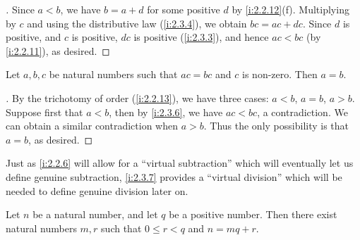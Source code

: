 \begin{proof}[]
  Since \(a < b\), we have \(b = a + d\) for some positive \(d\) by \cref{i:2.2.12}(f).
  Multiplying by \(c\) and using the distributive law (\cref{i:2.3.4}), we obtain \(bc = ac + dc\).
  Since \(d\) is positive, and \(c\) is positive, \(dc\) is positive (\cref{i:2.3.3}), and hence \(ac < bc\) (by \cref{i:2.2.11}), as desired.
\end{proof}

\begin{cor}\label{i:2.3.7}
  Let \(a, b, c\) be natural numbers such that \(ac = bc\) and \(c\) is non-zero.
  Then \(a = b\).
\end{cor}

\begin{proof}[]
  By the trichotomy of order (\cref{i:2.2.13}), we have three cases: \(a < b\), \(a = b\), \(a > b\).
  Suppose first that \(a < b\), then by \cref{i:2.3.6}, we have \(ac < bc\), a contradiction.
  We can obtain a similar contradiction when \(a > b\).
  Thus the only possibility is that \(a = b\), as desired.
\end{proof}

\begin{rmk}\label{i:2.3.8}
  Just as \cref{i:2.2.6} will allow for a ``virtual subtraction'' which will eventually let us define genuine subtraction, \cref{i:2.3.7} provides a ``virtual division'' which will be needed to define genuine division later on.
\end{rmk}

\begin{prop}\label{i:2.3.9}
  Let \(n\) be a natural number, and let \(q\) be a positive number.
  Then there exist natural numbers \(m, r\) such that \(0 \leq r < q\) and \(n = mq + r\).
\end{prop}

